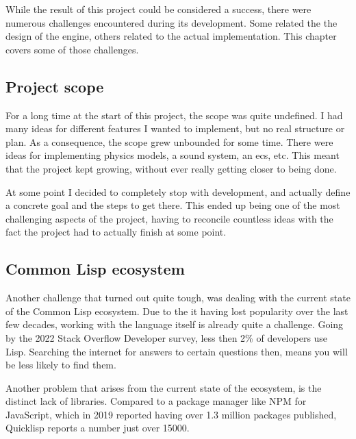 
While the result of this project could be considered a success,
there were numerous challenges encountered during its development.
Some related the the design of the engine,
others related to the actual implementation.
This chapter covers some of those challenges.

\subsection{Project scope}

For a long time at the start of this project,
the scope was quite undefined.
I had many ideas for different features I wanted to implement,
but no real structure or plan.
As a consequence,
the scope grew unbounded for some time.
There were ideas for implementing physics models,
a sound system,
an \ac{ecs}, etc.
This meant that the project kept growing,
without ever really getting closer to being done.

At some point I decided to completely stop with development,
and actually define a concrete goal and the steps to get there.
This ended up being one of the most challenging aspects of the project,
having to reconcile countless ideas with the fact the project had to actually finish at some point.

\subsection{Common Lisp ecosystem}


Another challenge that turned out quite tough,
was dealing with the current state of the Common Lisp ecosystem.
Due to the it having lost popularity over the last few decades,
working with the language itself is already quite a challenge.
Going by the 2022 Stack Overflow Developer survey,
less then 2\% of developers use Lisp.
Searching the internet for answers to certain questions then,
means you will be less likely to find them.

Another problem that arises from the current state of the ecosystem,
is the distinct lack of libraries.
Compared to a package manager like NPM for JavaScript,
which in 2019 reported having over 1.3 million packages published\cite{npm},
Quicklisp reports a number just over 15000\cite{quicklisp}.


